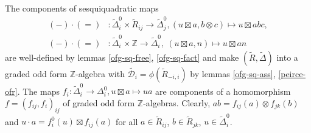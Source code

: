 \documentclass{article}
\theoremstyle{definition}
\begin{document}
The components of sesquiquadratic maps
\begin{align*}
    ({-}) \cdot ({=})
    &\colon \widetilde \Delta^0_i
    \times \widetilde R_{ij}
    \to \widetilde \Delta^0_j,
    (u \boxtimes a, b \otimes c)
    \mapsto u \boxtimes abc,
    \\
    ({-}) \cdot ({=})
    &\colon \widetilde \Delta^0_i \times \mathbb Z
    \to \widetilde \Delta^0_i,\
    (u \boxtimes a, n) \mapsto u \boxtimes an
\end{align*}
are well-defined by lemmas \ref{ofg-sq-free}, \ref{ofg-sq-fact} and make \(
    (\widetilde R, \widetilde \Delta)
\) into a graded odd form \(\mathbb Z\)-algebra with \(
    \widetilde{ \mathcal D_i }
    =
    \phi(\widetilde R_{-i, i})
\) by lemmas \ref{ofg-sq-ass}, \ref{peirce-ofr}. The maps \(
    f_i \colon \widetilde \Delta^0_i \to \Delta^0_i,
    u \boxtimes a \mapsto ua
\) are components of a homomorphism \(
    f = (f_{ij}, f_i)_{ij}
\) of graded odd form \(\mathbb Z\)-algebras. Clearly, \(
    ab = f_{ij}(a) \otimes f_{jk}(b)
\) and \(
    u \cdot a = f^0_i(u) \boxtimes f_{ij}(a)
\) for all \(a \in \widetilde R_{ij}\), \(b \in \widetilde R_{jk}\), \(u \in \widetilde \Delta^0_i\).
\end{document}
